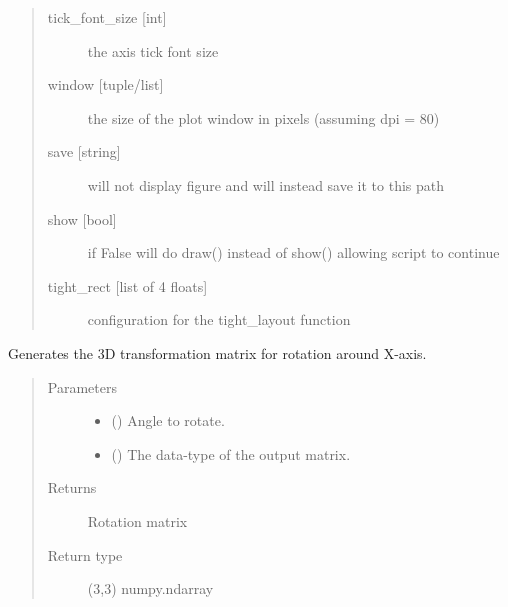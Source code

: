 \documentclass[letterpaper,10pt,english]{sphinxmanual}
\begin{document}
\begin{fulllineitems}
\begin{description}
\begin{quote}
\begin{description}
\item[{tick\_font\_size {[}int{]}}] \leavevmode
the axis tick font size

\item[{window {[}tuple/list{]}}] \leavevmode
the size of the plot window in pixels (assuming dpi = 80)

\item[{save {[}string{]}}] \leavevmode
will not display figure and will instead save it to this path

\item[{show {[}bool{]}}] \leavevmode
if False will do draw() instead of show() allowing script to continue

\item[{tight\_rect {[}list of 4 floats{]}}] \leavevmode
configuration for the tight\_layout function

\end{description}\end{quote}

\end{description}

\end{fulllineitems}


\begin{fulllineitems}
\label{\detokenize{modules/dpt_tools:dpt_tools.rot_mat_x}}
Generates the 3D transformation matrix for rotation around X-axis.
\begin{quote}\begin{description}
\item[{Parameters}] \leavevmode\begin{itemize}
\item {} 
 () \textendash{} Angle to rotate.

\item {} 
 () \textendash{} The data-type of the output matrix.

\end{itemize}

\item[{Returns}] \leavevmode
Rotation matrix

\item[{Return type}] \leavevmode
(3,3) numpy.ndarray

\end{description}\end{quote}

\end{fulllineitems}
\end{document}
